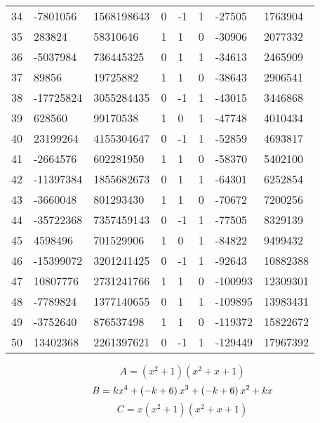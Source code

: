 \documentclass{amsart}
\begin{document}
\begin{longtable}{|l|l|l|lllll|}
34&-7801056&1568198643&0&-1&1&-27505&1763904\\
35&283824&58310646&1&1&0&-30906&2077332\\
36&-5037984&736445325&0&1&1&-34613&2465909\\
37&89856&19725882&1&1&0&-38643&2906541\\
38&-17725824&3055284435&0&-1&1&-43015&3446868\\
39&628560&99170538&1&0&1&-47748&4010434\\
40&23199264&4155304647&0&-1&1&-52859&4693817\\
41&-2664576&602281950&1&1&0&-58370&5402100\\
42&-11397384&1855682673&0&1&1&-64301&6252854\\
43&-3660048&801293430&1&1&0&-70672&7200256\\
44&-35722368&7357459143&0&-1&1&-77505&8329139\\
45&4598496&701529906&1&0&1&-84822&9499432\\
46&-15399072&3201241425&0&-1&1&-92643&10882388\\
47&10807776&2731241766&1&1&0&-100993&12309301\\
48&-7789824&1377140655&0&1&1&-109895&13983431\\
49&-3752640&876537498&1&1&0&-119372&15822672\\
50&13402368&2261397621&0&-1&1&-129449&17967392\\
\hline
\end{longtable}
$$A=(x^2
 + 1)(x^2
 + x
 + 1)$$
$$B=k\*x^4
 + \left(-k
 + 6\right) \*x^3
 + \left(-k
 + 6\right) \*x^2
 + k\*x$$
$$C=x(x^2
 + 1)(x^2
 + x
 + 1)$$
\end{document}
